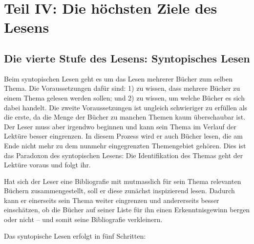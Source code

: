 \documentclass[a4paper,11pt]{scrartcl}
\begin{document}
\newpage
\section*{Teil IV: Die höchsten Ziele des Lesens}

\subsection{Die vierte Stufe des Lesens: Syntopisches Lesen}

Beim syntopischen Lesen geht es um das Lesen mehrerer Bücher zum selben Thema. Die Voraussetzungen dafür sind: 1) zu wissen, dass mehrere Bücher zu einem Thema gelesen werden sollen; und 2) zu wissen, um welche Bücher es sich dabei handelt. Die zweite Voraussetzungen ist ungleich schwieriger zu erfüllen als die erste, da die Menge der Bücher zu manchen Themen kaum überschaubar ist. Der Leser muss aber irgendwo beginnen und kann sein Thema im Verlauf der Lektüre besser eingrenzen. In diesem Prozess wird er auch Bücher lesen, die am Ende nicht mehr zu dem nunmehr eingegrenzten Themengebiet gehören. Dies ist das Paradoxon des syntopischen Lesens: Die Identifikation des Themas geht der Lektüre voraus und folgt ihr.

Hat sich der Leser eine Bibliografie mit mutmasslich für sein Thema relevanten Büchern zusammengestellt, soll er diese zunächst inspizierend lesen. Dadurch kann er einerseits sein Thema weiter eingrenzen und andererseits besser einschätzen, ob die Bücher auf seiner Liste für ihn einen Erkenntnisgewinn bergen oder nicht – und somit seine Bibliografie verkleinern.

Das syntopische Lesen erfolgt in fünf Schritten:
\end{document}
